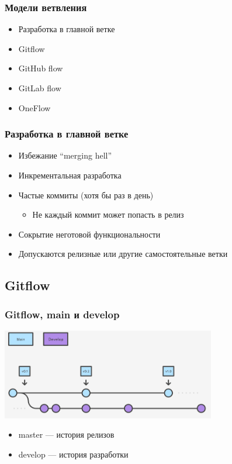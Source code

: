 \documentclass{../../slides-style}
\begin{document}
    \begin{frame}
        \frametitle{Модели ветвления}
        \begin{itemize}
            \item Разработка в главной ветке
            \item Gitflow
            \item GitHub flow
            \item GitLab flow
            \item OneFlow
        \end{itemize}
    \end{frame}

    \begin{frame}
        \frametitle{Разработка в главной ветке}
        \begin{itemize}
            \item Избежание ``merging hell''
            \item Инкрементальная разработка
            \item Частые коммиты (хотя бы раз в день)
            \begin{itemize}
                \item Не каждый коммит может попасть в релиз
            \end{itemize}
            \item Сокрытие неготовой функциональности
            \item Допускаются релизные или другие самостоятельные ветки
        \end{itemize}
    \end{frame}

    \subsection{Gitflow}

    \begin{frame}
        \frametitle{Gitflow, main и develop}
        \begin{center}
            \includegraphics[width=0.7\textwidth]{gitflow1.png}
        \end{center}
        \begin{itemize}
            \item master --- история релизов
            \item develop --- история разработки
        \end{itemize}
    \end{frame}
\end{document}

